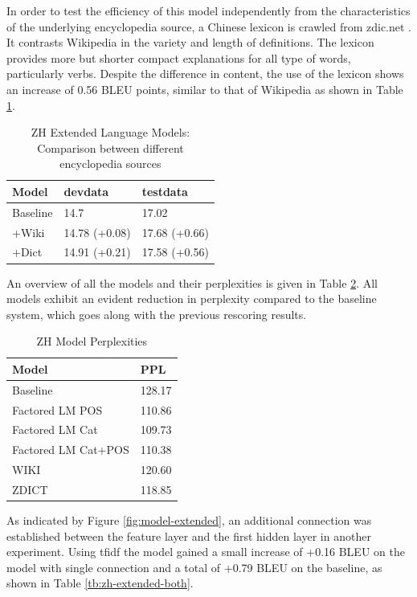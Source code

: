 \documentclass[a4paper]{article}
\begin{document}
In order to test the efficiency of this model independently from the characteristics of the  underlying encyclopedia  source, a Chinese lexicon is crawled from zdic.net \cite{zdic}. It contrasts Wikipedia in the variety and length of definitions. The lexicon provides more but shorter compact explanations for all type of words, particularly verbs. Despite the difference in content, the use of the lexicon shows an increase of 0.56 BLEU points, similar to that of Wikipedia as shown in Table \ref{tb:zh-extended-diff-sources}.

\begin{table}
\caption{ZH Extended Language Models: Comparison between different encyclopedia sources}
\centering
  \begin{tabular}{lll}
  	\hline
  	Model    & devdata       & testdata      \\ \hline\hline
  	Baseline & 14.7          & 17.02         \\ \hline
  	+Wiki    & 14.78 (+0.08) & 17.68 (+0.66) \\
  	+Dict    & 14.91 (+0.21) & 17.58 (+0.56) \\ \hline
  \end{tabular}
  \label{tb:zh-extended-diff-sources}
\end{table}

An overview of all the models and their perplexities is given in Table \ref{tb:PPL}. All models exhibit an evident reduction in perplexity compared to the baseline system, which goes along with the previous rescoring results.

\begin{table} 
  \caption{ZH Model Perplexities}
  \centering
  \begin{tabular}{ ll}
  	\hline
  	Model               & PPL    \\ \hline\hline
  	Baseline            & 128.17 \\ \hline
  	Factored LM POS     & 110.86 \\
  	Factored LM Cat     & 109.73 \\
  	Factored LM Cat+POS & 110.38 \\ \hline
  	WIKI                & 120.60 \\
  	ZDICT               & 118.85 \\ \hline
  \end{tabular}
  \label{tb:PPL}
\end{table}


As indicated by Figure \ref{fig:model-extended}, an additional connection was established between the feature layer and the first hidden layer in another experiment. Using tfidf the model gained a small increase of +0.16 BLEU on the model with single connection and a total of +0.79 BLEU on the baseline, as shown in Table \ref{tb:zh-extended-both}.
\end{document}
